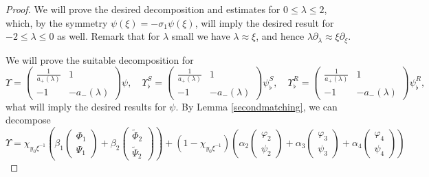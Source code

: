 \documentclass[11 pt]{amsart}
\theoremstyle{definition}
\theoremstyle{remark}
\numberwithin{equation}{section}
\begin{document}
\begin{proof}
We will prove the desired decomposition and estimates for $0\leq \lambda \leq 2$, which, by the symmetry $\psi(\xi)=-\sigma_1\psi(\xi)$, will imply the desired result for $-2\leq \lambda \leq 0$ as well. Remark that for $\lambda$ small we have $\lambda \approx \xi$, and hence $\lambda \partial_{\lambda} \approx \xi \partial_{\xi} $.

We will prove the suitable decomposition for 
$$
\Upsilon=\begin{pmatrix}  \frac{1}{a_+ (\lambda)} & 1\\ - 1 & - a_- (\lambda)  \end{pmatrix} \psi, \quad \Upsilon_\flat^S=\begin{pmatrix}  \frac{1}{a_+ (\lambda)} & 1\\ - 1 & - a_- (\lambda)  \end{pmatrix} \psi_\flat^S, \quad \Upsilon_\flat^R=\begin{pmatrix}  \frac{1}{a_+ (\lambda)} & 1\\ - 1 & - a_- (\lambda)  \end{pmatrix} \psi_\flat^R,
$$
what will imply the desired results for $\psi$. By Lemma \ref{secondmatching}, we can decompose
\begin{equation} \label{id:proof:decomposition-varphi} \Upsilon = \chi_{y_0\xi^{-1}}\left(\beta_1 \left(\begin{array}{c}
       \Phi_1\\
       \Psi_1
     \end{array}\right) + \beta_2 \left(\begin{array}{c}
       \widetilde{\Phi}_2\\
       \widetilde{\Psi}_2
     \end{array}\right)\right) +(1-\chi_{y_0\xi^{-1}})\left(\alpha_2 \left(\begin{array}{c}
       \varphi_2\\
       \psi_2
     \end{array}\right) + \alpha_3 \left(\begin{array}{c}
       \varphi_3\\
       \psi_3
     \end{array}\right) + \alpha_4 \left(\begin{array}{c}
       \varphi_4\\
       \psi_4
     \end{array}\right) \right)
\end{equation}


\end{proof}
\end{document}
